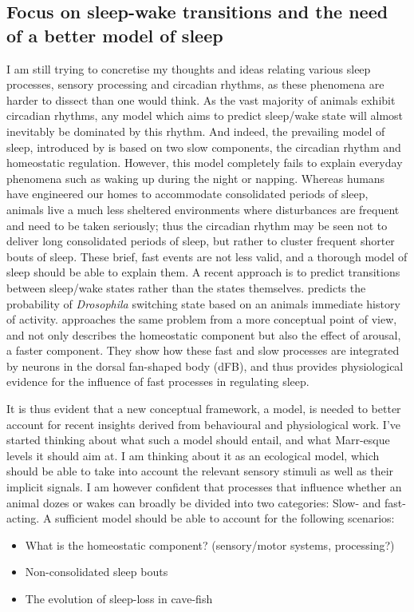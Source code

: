 \subsection{Focus on sleep-wake transitions and the need of a better model of sleep} \label{model}
I am still trying to concretise my thoughts and ideas relating various sleep processes, sensory processing and circadian rhythms, as these phenomena are harder to dissect than one would think.
As the vast majority of animals exhibit circadian rhythms, any model which aims to predict sleep/wake state will almost inevitably be dominated by this rhythm. And indeed, the prevailing model of sleep, introduced by \cite{Borbely2016} is based on two slow components, the circadian rhythm and homeostatic regulation. However, this model completely fails to explain everyday phenomena such as waking up during the night or napping. Whereas humans have engineered our homes to accommodate consolidated periods of sleep, animals live a much less sheltered environments where disturbances are frequent and need to be taken seriously; thus the circadian rhythm may be seen not to deliver long consolidated periods of sleep, but rather to cluster frequent shorter bouts of sleep. These brief, fast events are not less valid, and a thorough model of sleep should be able to explain them. A recent approach is to predict transitions between sleep/wake states rather than the states themselves. \cite{Wiggin2020a} predicts the probability of \textit{Drosophila} switching state based on an animals immediate history of activity. \cite{Ni2019a} approaches the same problem from a more conceptual point of view, and not only describes the homeostatic component but also the effect of arousal, a faster component. They show how these fast and slow processes are integrated by neurons in the dorsal fan-shaped body (dFB), and thus provides physiological evidence for the influence of fast processes in regulating sleep.

It is thus evident that a new conceptual framework, a model, is needed to better account for recent insights derived from behavioural and physiological work. I've started thinking about what such a model should entail, and what Marr-esque levels it should aim at. I am thinking about it as an ecological model, which should be able to take into account the relevant sensory stimuli as well as their implicit signals. I am however confident that processes that influence whether an animal dozes or wakes can broadly be divided into two categories: Slow- and fast-acting. 
A sufficient model should be able to account for the following scenarios:
\begin{itemize}
    \item What is the homeostatic component? (sensory/motor systems, processing?)
    \item Non-consolidated sleep bouts
    \item The evolution of sleep-loss in cave-fish \citep{Duboue2011}
\end{itemize}



